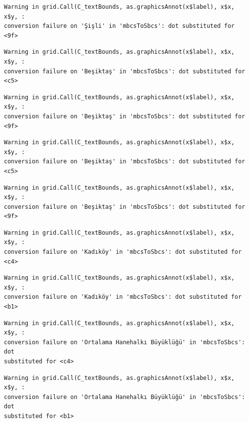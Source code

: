 \documentclass[
  11pt,
  a4paper,
  DIV=11,
  numbers=noendperiod]{scrartcl}
\begin{document}
\begin{verbatim}
Warning in grid.Call(C_textBounds, as.graphicsAnnot(x$label), x$x, x$y, :
conversion failure on 'Şişli' in 'mbcsToSbcs': dot substituted for <9f>
\end{verbatim}

\begin{verbatim}
Warning in grid.Call(C_textBounds, as.graphicsAnnot(x$label), x$x, x$y, :
conversion failure on 'Beşiktaş' in 'mbcsToSbcs': dot substituted for <c5>
\end{verbatim}

\begin{verbatim}
Warning in grid.Call(C_textBounds, as.graphicsAnnot(x$label), x$x, x$y, :
conversion failure on 'Beşiktaş' in 'mbcsToSbcs': dot substituted for <9f>
\end{verbatim}

\begin{verbatim}
Warning in grid.Call(C_textBounds, as.graphicsAnnot(x$label), x$x, x$y, :
conversion failure on 'Beşiktaş' in 'mbcsToSbcs': dot substituted for <c5>
\end{verbatim}

\begin{verbatim}
Warning in grid.Call(C_textBounds, as.graphicsAnnot(x$label), x$x, x$y, :
conversion failure on 'Beşiktaş' in 'mbcsToSbcs': dot substituted for <9f>
\end{verbatim}

\begin{verbatim}
Warning in grid.Call(C_textBounds, as.graphicsAnnot(x$label), x$x, x$y, :
conversion failure on 'Kadıköy' in 'mbcsToSbcs': dot substituted for <c4>
\end{verbatim}

\begin{verbatim}
Warning in grid.Call(C_textBounds, as.graphicsAnnot(x$label), x$x, x$y, :
conversion failure on 'Kadıköy' in 'mbcsToSbcs': dot substituted for <b1>
\end{verbatim}

\begin{verbatim}
Warning in grid.Call(C_textBounds, as.graphicsAnnot(x$label), x$x, x$y, :
conversion failure on 'Ortalama Hanehalkı Büyüklüğü' in 'mbcsToSbcs': dot
substituted for <c4>
\end{verbatim}

\begin{verbatim}
Warning in grid.Call(C_textBounds, as.graphicsAnnot(x$label), x$x, x$y, :
conversion failure on 'Ortalama Hanehalkı Büyüklüğü' in 'mbcsToSbcs': dot
substituted for <b1>
\end{verbatim}
\end{document}
